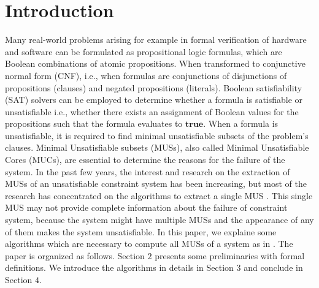 \section{Introduction}
\label{sec:introduction}
Many real-world problems arising for example in formal verification of hardware and software can be formulated as propositional logic formulas, which are Boolean combinations of atomic propositions. When transformed to conjunctive normal form (CNF), i.e., when formulas are conjunctions of disjunctions of propositions (clauses) and negated propositions (literals). Boolean satisfiability (SAT) solvers can be employed to determine whether a formula is satisfiable or unsatisfiable i.e., whether there exists an assignment of Boolean values for the propositions such that the formula evaluates to $\mathbf{true}$. When a formula is unsatisfiable, it is required to find minimal unsatisfiable subsets of the problem's clauses. Minimal Unsatisfiable subsets (MUSs), also called Minimal Unsatisfiable Cores (MUCs), are essential to determine the reasons for the failure of the system. In the past few years, the interest and research on the extraction of MUSs of an unsatisfiable constraint system has been increasing, but most of the research has concentrated on the algorithms to extract a single MUS \cite{karem}. This single MUS may not provide complete information about the failure of constraint system, because the system might have multiple MUSs and the appearance of any of them makes the system unsatisfiable.\newline
In this paper, we explaine some algorithms which are necessary to compute all MUSs of a system as in \cite{karem}. The paper is organized as follows. Section $2$ presents some preliminaries with formal definitions. We introduce the algorithms in details in Section $3$ and conclude in Section $4$.